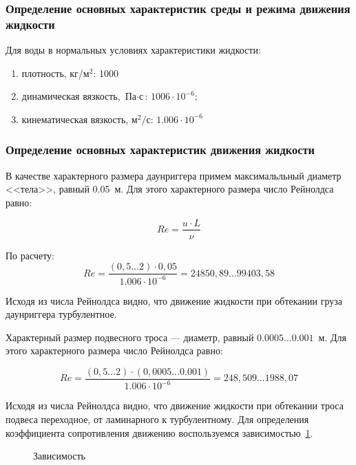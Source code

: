 \documentclass[russian,utf8, pointsubsection]{eskdtext}
\begin{document}
\subsubsection{Определение основных характеристик среды и режима движения жидкости}
Для воды в нормальных условиях характеристики жидкости:
\begin{enumerate}
\item плотность, кг/м$^2$: 1000
\item динамическая вязкость, $\text{Па}\cdot\text{с}$: $1006\cdot10^{-6}$; \cite{waterProps}
\item кинематическая вязкость, $\text{м}^2/\text{с}$: $1.006\cdot10^{-6}$ \cite{waterProps}
\end{enumerate}

\subsubsection{Определение основных характеристик движения жидкости}
В качестве характерного размера даунриггера примем максимальльный диаметр <<тела>>, равный 0.05~м. Для этого характерного размера число Рейнолдса равно:

\begin{equation}
Re = \frac{u\cdot{L}}{\nu} 
\end{equation}

По расчету:
\begin{equation}
Re = \frac{(0,5\dots2)\cdot{0,05}}{1.006\cdot10^{-6}}=24850,89\dots99403,58
\end{equation}

Исходя из числа Рейнолдса видно, что движение жидкости при обтекании груза даунриггера турбулентное.

Характерный размер подвесного троса --- диаметр, равный $0.0005\dots0.001$~м. Для этого характерного размера число Рейнолдса равно:

\begin{equation}
Re = \frac{(0,5\dots2)\cdot{(0,0005\dots0.001)}}{1.006\cdot10^{-6}}=248,509\dots1988,07
\end{equation}

Исходя из числа Рейнолдса видно, что движение жидкости при обтекании троса подвеса переходное, от ламинарного к турбулентному. Для определения коэффициента сопротивления движению воспользуемся зависимостью~\ref{ris:grsphCd}.

\begin{figure}[h]
\caption{Зависимость}\label{ris:grsphCd}
\end{figure}



\end{document}
